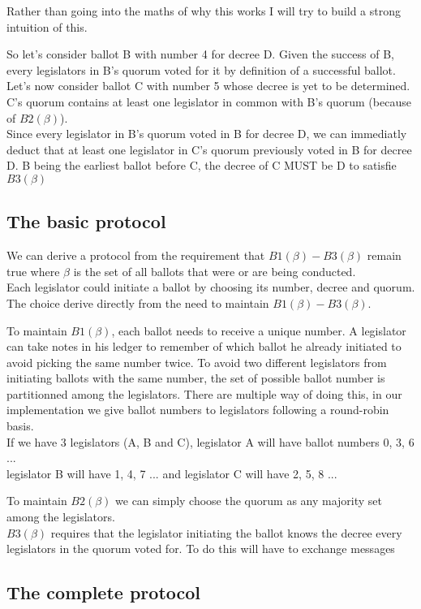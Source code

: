 \documentclass{article}
\begin{document}
Rather than going into the maths of why this works I will try to build a strong intuition of this.

So let's consider ballot B with number 4 for decree D. Given the success of B, every legislators in B's quorum voted for it by definition of a successful ballot.\\
Let's now consider ballot C with number 5 whose decree is yet to be determined. C's quorum contains at least one legislator in common with B's quorum (because of $B2(\beta)$).\\
Since every legislator in B's quorum voted in B for decree D, we can immediatly deduct that at least one legislator in C's quorum previously voted in B for decree D. B being the earliest ballot before C, the decree of C MUST be D to satisfie $B3(\beta)$

\subsection{The basic protocol}
We can derive a protocol from the requirement that $B1(\beta)-B3(\beta)$ remain true where $\beta$ is the set of all ballots that were or are being conducted.\\
Each legislator could initiate a ballot by choosing its number, decree and quorum. The choice derive directly from the need to maintain $B1(\beta)-B3(\beta)$.

To maintain $B1(\beta)$, each ballot needs to receive a unique number. A legislator can take notes in his ledger to remember of which ballot he already initiated to avoid picking the same number twice. To avoid two different legislators from initiating ballots with the same number, the set of possible ballot number is partitionned among the legislators. There are multiple way of doing this, in our implementation we give ballot numbers to legislators following a round-robin basis.\\
If we have 3 legislators (A, B and C), legislator A will have ballot numbers 0, 3, 6 ...\\
legislator B will have 1, 4, 7 ... and legislator C will have 2, 5, 8 ...

To maintain $B2(\beta)$ we can simply choose the quorum as any majority set among the legislators.\\

$B3(\beta)$ requires that the legislator initiating the ballot knows the decree every legislators in the quorum voted for. To do this will have to exchange messages

\subsection{The complete protocol}
\end{document}
